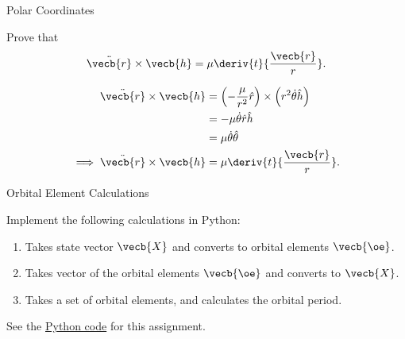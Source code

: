 \begin{hwkProblem}{2}{Polar Coordinates} \label{hwk:p02}

	Prove that \[ \ddot{\vecb{r}} \times \vecb{h} = \mu \deriv{t}{\frac{\vecb{r}}{r}} .\]

	\hwkSol{} \label{hwk:s02}

	\begin{align*}
		\ddot{\vecb{r}} \times \vecb{h}          & = \left(- \frac{\mu}{r^{2}} \hat{r}\right) \times \left(r^{2} \dot{\theta} \hat{h}\right) \\
		\,                                       & = - \mu \dot{\theta} \hat{r} \hat{h}                                                      \\
		\,                                       & = \mu \dot{\theta} \hat{\theta}                                                           \\
		\implies \ddot{\vecb{r}} \times \vecb{h} & = \mu \deriv{t}{\frac{\vecb{r}}{r}}
		.\end{align*}

\end{hwkProblem}

\begin{hwkProblem}{3}{Orbital Element Calculations} \label{hwk:p03}

	Implement the following calculations in Python:
	\begin{enumerate}
		\item \label{hwk:p03a} Takes state vector \(\vecb{X}\) and converts to orbital elements \(\vecb{\oe}\).
		\item \label{hwk:p03b} Takes vector of the orbital elements \(\vecb{\oe}\) and converts to \(\vecb{X}\).
		\item \label{hwk:p03c} Takes a set of orbital elements, and calculates the orbital period.
	\end{enumerate}

	\hwkCode{} \label{code:s03}

	See the \href{https://www.github.com/vaisriv/enae441-hw01/blob/main/src/hw01.py}{Python code} for this assignment.

\end{hwkProblem}

